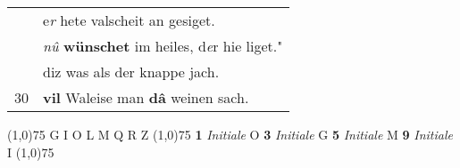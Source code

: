 \documentclass[8pt,a4paper,notitlepage]{article}
\begin{document}
\begin{table}[ht]
\begin{minipage}[t]{0.5\linewidth}
\begin{tabular}{rl}
 & e\textit{r} hete valscheit an gesiget.\\ 
 & \textit{nû} \textbf{wünschet} im heiles, d\textit{e}r hie liget."\\ 
 & diz was als der knappe jach.\\ 
30 & \textbf{vil} Waleise man \textbf{dâ} weinen sach.\\ 
\end{tabular}
\scriptsize
\line(1,0){75} \newline
G I O L M Q R Z \newline
\line(1,0){75} \newline
\textbf{1} \textit{Initiale} O  \textbf{3} \textit{Initiale} G  \textbf{5} \textit{Initiale} M  \textbf{9} \textit{Initiale} I  \newline
\line(1,0){75} \newline

\end{minipage}
\end{table}
\end{document}
